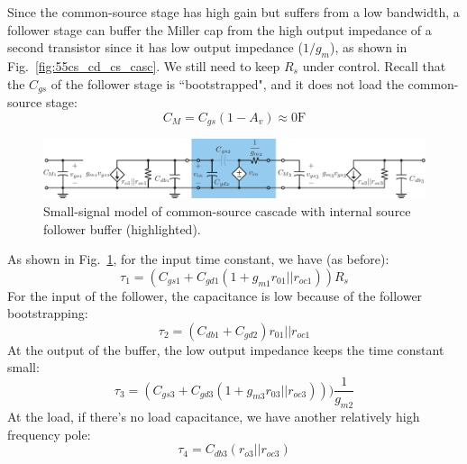 Since the common-source stage has high gain but suffers from a low bandwidth, a follower stage can buffer the Miller cap from the high output impedance of a second transistor since it has low output impedance ($1/g_m$), as shown in Fig.~\ref{fig:55cs_cd_cs_casc}.  We still need to keep $R_s$ under control.  Recall that the $C_{gs}$ of the follower stage is ``bootstrapped", and it does not load the common-source stage:
\begin{equation}
	C_M = C_{gs} (1 - A_v) \approx 0 \mathrm{F}
\end{equation}
\begin{figure}[tb]
\begin{center}
\includegraphics[width=\columnwidth]{5cs_cd_cs_casc_ss_miller}
\end{center}
\caption{Small-signal model of common-source cascade with internal source follower buffer (highlighted).}
\label{fig:5cs_cd_cs_casc_ss_miller}
\end{figure}
\noindent As shown in Fig.~\ref{fig:5cs_cd_cs_casc_ss_miller}, for the input time constant, we have (as before):   
\begin{equation} 
	\tau_1 = (C_{gs1} + C_{gd1} (1 + g_{m1} r_{01}||r_{oc1})) R_s 
\end{equation}
For the input of the follower, the capacitance is low because of the follower bootstrapping:
 \begin{equation} 
 	\tau_2 = (C_{db1} + C_{gd2} ) r_{01}||r_{oc1} 
\end{equation}
At the output of the buffer, the low output impedance keeps the time constant small:
\begin{equation}  
	\tau_3 = (C_{gs3} + C_{gd3} (1 + g_{m3} r_{03}||r_{oc3}))) \frac{1}{g_{m2}} 
\end{equation}
At the load, if there's no load capacitance, we have another relatively high frequency pole:
\begin{equation}  
	\tau_4 = C_{db3} (r_{o3} || r_{oc3})
\end{equation}
